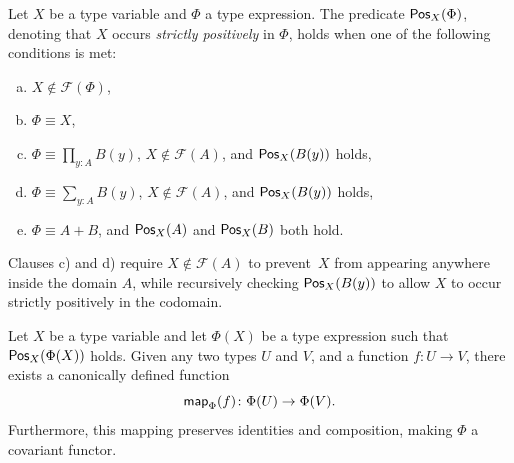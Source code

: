 \begin{defn}
    Let $X$ be a type variable and $\Phi$ a type expression. The predicate $\mathsf{Pos}_X(\Phi)$, denoting that $X$ occurs \textsl{strictly positively} in $\Phi$, holds when one of the following conditions is met:
    \begin{enumerate}[a),font=\upshape]
        \item $X\notin\mathcal F(\Phi)$,
        
        \item $\Phi\equiv X$,
        
        \item $\Phi\equiv\prod_{y\colon A}B(y)$, $X\notin\mathcal F(A)$, and $\mathsf{Pos}_X(B(y))$ holds,
        
        \item $\Phi\equiv\sum_{y\colon A}B(y)$, $X \notin\mathcal F(A)$, and $\mathsf{Pos}_X(B(y))$ holds,
        
        \item $\Phi\equiv A+B$, and $\mathsf{Pos}_X(A)$ and $\mathsf{Pos}_X(B)$ both hold.
    \end{enumerate}
\end{defn}

\begin{rem}
    Clauses c) and d) require $X\notin\mathcal F(A)$ to prevent~$X$ from appearing anywhere inside the domain $A$, while recursively checking $\mathsf{Pos}_X(B(y))$ to allow $X$ to occur strictly positively in the codomain.
\end{rem}

\begin{thm}\label{thm:Phi-functoriality}
    Let $X$ be a type variable and let $\Phi(X)$ be a type expression such that $\mathsf{Pos}_X(\Phi(X))$ holds. Given any two types $U$ and $V$, and a function $f\colon U\to V$, there exists a canonically defined function
    \[
        \fun{map}_\Phi(f)\colon \Phi(U)\to \Phi(V).
    \]
    Furthermore, this mapping preserves identities and composition, making $\Phi$ a covariant functor.
\end{thm}

